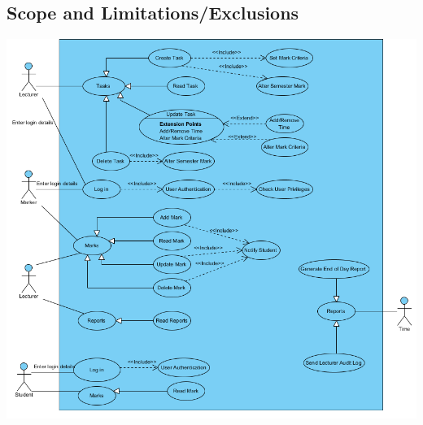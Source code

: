 \documentclass[12pt]{article}
\begin{document}
  \subsection{Scope and Limitations/Exclusions}
  \begin{center}
  \advance\leftskip-2.0cm
  \includegraphics[width=180mm]{UseCaseDiagram1.png}  
  \end{center}
\end{document}
